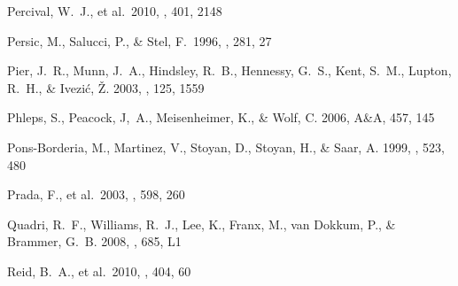 \documentclass[]{emulateapj}
\begin{document}
\begin{thebibliography}{999}
Percival, W.~J., et al.\ 2010, \mnras, 401, 2148

Persic, M., Salucci, P., \& Stel, F.\ 1996, \mnras, 281, 27


Pier, J.\ R., Munn, J.\ A., Hindsley, R.\ B., Hennessy, G.\ S., Kent, S.\ M.,
Lupton, R.\ H., \& Ivezi\'{c}, \v{Z}. 2003, \aj, 125, 1559

Phleps, S., Peacock, J,\ A., Meisenheimer, K., \& Wolf, C. 2006,
A\&A, 457, 145 %


Pons-Borderia, M., Martinez, V., Stoyan, D., Stoyan, H., \& Saar, A.
1999, \apj, 523, 480




Prada, F., et al.\ 2003, \apj, 598, 260

Quadri, R.\ F., Williams, R.\ J., Lee, K., Franx, M., van Dokkum, P., \&
Brammer, G.\ B. 2008,
\apj, 685, L1

Reid, B.\ A., et al.\ 2010, \mnras, 404, 60


\end{thebibliography}
\end{document}
